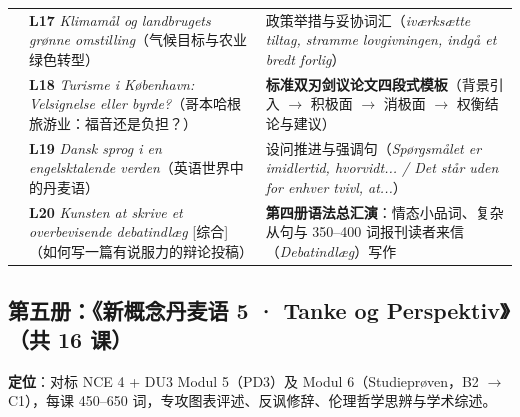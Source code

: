 \documentclass[10.5pt, a4paper]{ctexart}
\begin{document}
{\begin{longtable}{@{} >{\raggedright\arraybackslash}p{2.65cm} >{\raggedright\arraybackslash}p{5.7cm} >{\raggedright\arraybackslash}p{7.25cm} @{}}
 & \textbf{L17} \textit{Klimamål og landbrugets grønne omstilling}（气候目标与农业绿色转型） & 政策举措与妥协词汇（\textit{iværksætte tiltag, stramme lovgivningen, indgå et bredt forlig}） \\
 & \textbf{L18} \textit{Turisme i København: Velsignelse eller byrde?}（哥本哈根旅游业：福音还是负担？） & \textbf{标准双刃剑议论文四段式模板}（背景引入 $\rightarrow$ 积极面 $\rightarrow$ 消极面 $\rightarrow$ 权衡结论与建议） \\
 & \textbf{L19} \textit{Dansk sprog i en engelsktalende verden}（英语世界中的丹麦语） & 设问推进与强调句（\textit{Spørgsmålet er imidlertid, hvorvidt... / Det står uden for enhver tvivl, at...}） \\
 & \textbf{L20} \textit{Kunsten at skrive et overbevisende debatindlæg} [综合]（如何写一篇有说服力的辩论投稿） & \textbf{第四册语法总汇演}：情态小品词、复杂从句与 350--400 词报刊读者来信（\textit{Debatindlæg}）写作 \\
\end{longtable}
}

\subsection{第五册：《新概念丹麦语 5 · Tanke og Perspektiv》（共 16 课）}
\textbf{定位}：对标 NCE 4 + DU3 Modul 5（PD3）及 Modul 6（Studieprøven，B2 $\rightarrow$ C1），每课 450--650 词，专攻图表评述、反讽修辞、伦理哲学思辨与学术综述。
\end{document}
